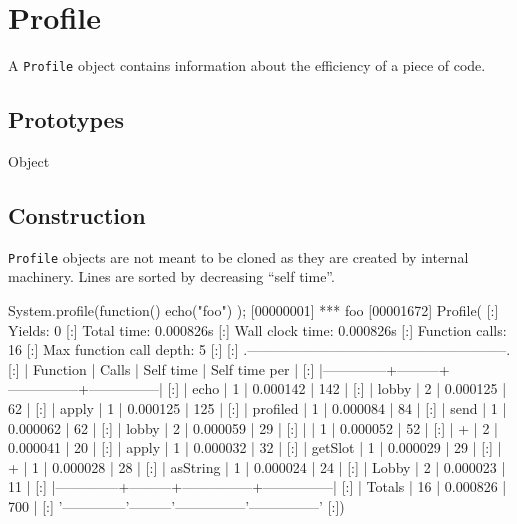 
\section{Profile}

A \lstinline|Profile| object contains information about the efficiency of a
piece of code.

\subsection{Prototypes}

\begin{refObjects}
\item[Object]
\end{refObjects}

\subsection{Construction}

\lstinline|Profile| objects are not meant to be cloned as they are created
by  internal machinery. Lines are sorted by
decreasing ``self time''.

\begin{urbiscript}
System.profile(function() { echo("foo") });
[00000001] *** foo
[00001672] Profile(
[:]  Yields: 0
[:]  Total time: 0.000826s
[:]  Wall clock time: 0.000826s
[:]  Function calls: 16
[:]  Max function call depth: 5
[:]
[:]  .--------------------------------------------------------.
[:]  |   Function   |  Calls  |   Self time   | Self time per |
[:]  |--------------+---------+---------------+---------------|
[:]  |         echo |       1 |      0.000142 |           142 |
[:]  |        lobby |       2 |      0.000125 |            62 |
[:]  |        apply |       1 |      0.000125 |           125 |
[:]  |     profiled |       1 |      0.000084 |            84 |
[:]  |         send |       1 |      0.000062 |            62 |
[:]  |        lobby |       2 |      0.000059 |            29 |
[:]  |              |       1 |      0.000052 |            52 |
[:]  |            + |       2 |      0.000041 |            20 |
[:]  |        apply |       1 |      0.000032 |            32 |
[:]  |      getSlot |       1 |      0.000029 |            29 |
[:]  |            + |       1 |      0.000028 |            28 |
[:]  |     asString |       1 |      0.000024 |            24 |
[:]  |        Lobby |       2 |      0.000023 |            11 |
[:]  |--------------+---------+---------------+---------------|
[:]  |       Totals |      16 |      0.000826 |           700 |
[:]  '--------------'---------'---------------'---------------'
[:])
\end{urbiscript}

